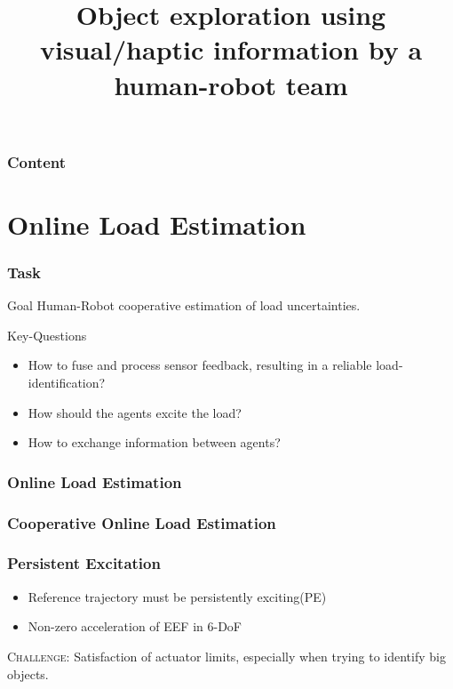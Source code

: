 \documentclass[student,noshadow]{ITRslides}
\title{Object exploration using visual/haptic information by a human-robot team}
\begin{document}
\begin{frame}
    \titlepage
\end{frame}

\begin{frame}
	\frametitle{Content}
	\tableofcontents
\end{frame}

\section{Online Load Estimation}
\begin{frame}
	\frametitle{Task}
	\begin{block}{Goal}
			Human-Robot cooperative estimation of load uncertainties.
	\end{block}
	\vspace{2mm}
	\begin{block}{Key-Questions}
			\begin{itemize}
				\item How to fuse and process sensor feedback, resulting in a reliable load-identification?
				\item How should the agents excite the load?
				\item How to exchange information between agents?
			\end{itemize}	   
	\end{block}	
\end{frame}

\begin{frame}
	\frametitle{Online Load Estimation}
\end{frame}

\begin{frame}
	\frametitle{Cooperative Online Load Estimation}
\end{frame}

\begin{frame}
	\frametitle{Persistent Excitation}
	\vspace{1cm}	
	\begin{itemize}
		\item Reference trajectory must be persistently exciting(PE)
		\item Non-zero acceleration of EEF in 6-DoF \cite{literaturstelle3}
	\end{itemize}
	\vspace{1cm}
	\textsc{Challenge}: Satisfaction of actuator limits, especially when trying to identify big objects.
\end{frame}
\end{document}
